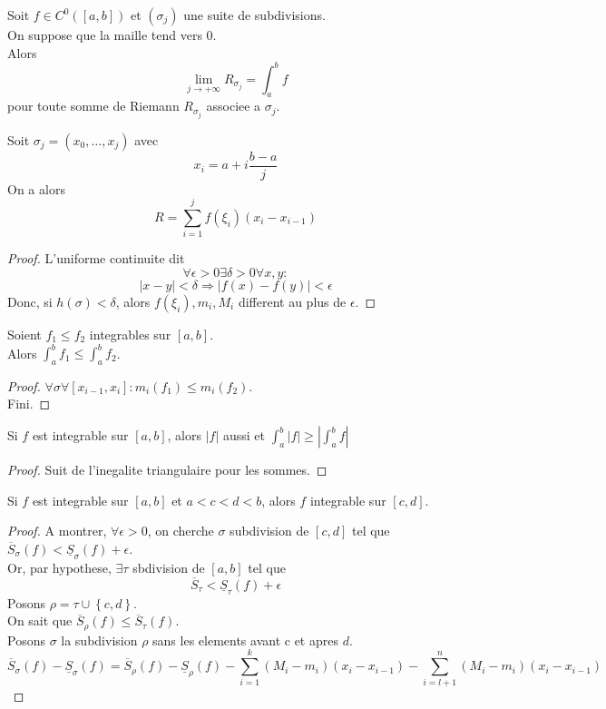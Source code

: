 \documentclass[../main.tex]{subfiles}
\begin{document}
\begin{propo}
	Soit $f \in C^{0}( [ a,b] ) $ et $( \sigma_j) $ une suite de subdivisions.\\
	On suppose que la maille tend vers 0.\\
	Alors
	\[ 
	\lim_{j \to  + \infty} R_{\sigma_j} = \int_{ a }^{ b }f
	\]
	pour toute somme de Riemann $R_{\sigma_j} $ associee a $\sigma_j$.\\
\end{propo}
\begin{exemple}
	Soit $\sigma_j = ( x_0, \ldots, x_j) $ avec
	\[ 
	x_i = a + i \frac{b-a}{j}
	\]
	On a alors
	\[ 
		R= \sum_{i=1}^{ j}f( \xi_i) ( x_i - x_{i-1} ) 
	\]
	
	
\end{exemple}
\begin{proof}
L'uniforme continuite dit
\[ 
\forall \epsilon> 0 \exists \delta>0 \forall x,y:
\]
\[ 
	|x-y| < \delta \Rightarrow |f( x) - f( y) | < \epsilon
\]
Donc, si $h( \sigma) <\delta$, alors
$f( \xi_i) , m_i, M_i$ different au plus de $\epsilon$.

\end{proof}
\begin{lemma}
	Soient $f_1\leq f_2$ integrables sur $[a,b]$.\\
	Alors $\int_{ a }^{ b }f_1\leq \int_{ a }^{ b } f_2$.
\end{lemma}
\begin{proof}
	$\forall \sigma \forall [ x_{i-1} , x_i] : m_i ( f_1) \leq m_i( f_2) $.\\
	Fini.
\end{proof}
\begin{lemma}
	Si $f$ est integrable sur $[a,b]$, alors $|f|$ aussi et $\int_{ a }^{ b }|f|\geq | \int_{ a }^{ b }f|$
\end{lemma}
\begin{proof}
Suit de l'inegalite triangulaire pour les sommes.
\end{proof}
\begin{lemma}
	Si $f$ est integrable sur $[a,b]$ et $a<c<d<b$, alors $f$ integrable sur $[c,d]$.
\end{lemma}
\begin{proof}
	A montrer, $\forall  \epsilon> 0$, on cherche $\sigma$ subdivision de $[c,d]$ tel que $\overline{S}_\sigma( f) < \underline{S}_\sigma( f) + \epsilon$.\\
	Or, par hypothese, $\exists \tau$ sbdivision de $[a,b]$ tel que
	\[ 
		\overline{S}_\tau < \underline{S}_\tau( f) +\epsilon	
	\]
	Posons $\rho= \tau \cup \left\{ c,d \right\} $.\\
	On sait que $\overline{S}_\rho( f) \leq \overline{S}_\tau( f) $.\\
	Posons $\sigma$ la subdivision $\rho$ sans les elements avant c et apres $d$.\\
	\[ 
		\overline{S}_\sigma( f) -\underline{S}_\sigma( f) = \overline{S}_\rho( f) - \underline{S}_\rho( f) - \sum_{i=1}^{ k}( M_i-m_i) ( x_i - x_{i-1} ) - \sum_{i=l+1}^{ n}( M_i-m_{i} ) ( x_i-x_{i-1} ) 
	\]
	
	
\end{proof}
\end{document}
